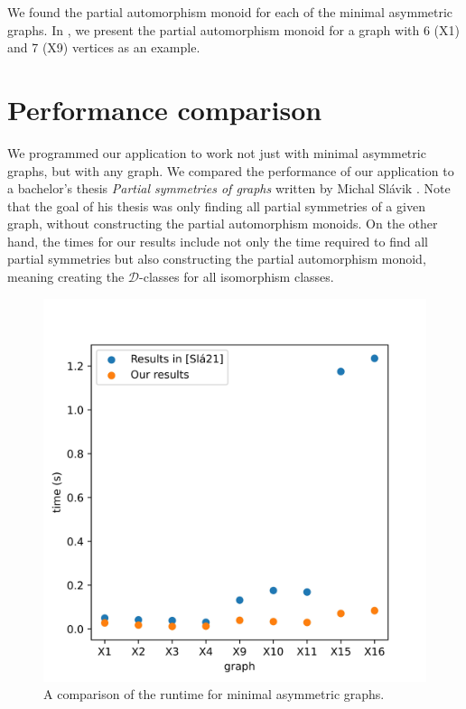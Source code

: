 We found the partial automorphism monoid for each of the minimal asymmetric graphs. In , we present the partial automorphism monoid for a graph with 6 (X1) and 7 (X9) vertices as an example.

\section{Performance comparison}
\label{sec:slavik_comparison}

We programmed our application to work not just with minimal asymmetric graphs, but with any graph. We compared the performance of our application to a bachelor's thesis \emph{Partial symmetries of graphs} written by Michal Slávik \cite{slavik}. Note that the goal of his thesis was only finding all partial symmetries of a given graph, without constructing the partial automorphism monoids. On the other hand, the times for our results include not only the time required to find all partial symmetries but also constructing the partial automorphism monoid, meaning creating the $\mathcal{D}$-classes for all isomorphism classes.

\begin{figure}[H]
\centering
\includegraphics[scale=0.8,keepaspectratio]{images/comparison_asymmetric_slavik.jpg}
\caption{A comparison of the runtime for minimal asymmetric graphs.}
\label{fig:comparison_asymmetric}
\end{figure}

